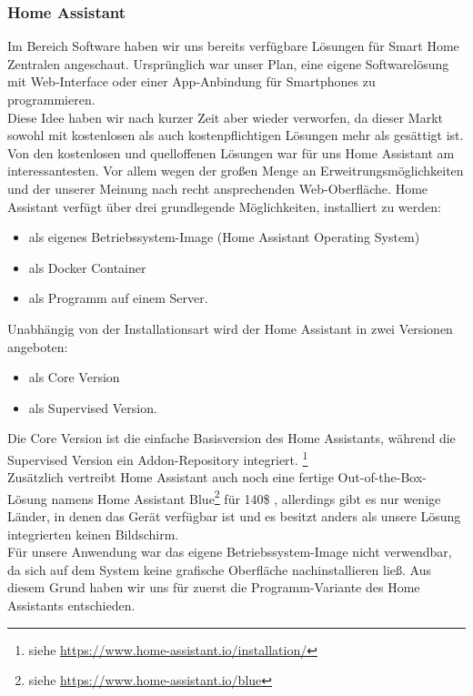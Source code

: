 \subsubsection{Home Assistant}\label{hwg_software_homeassistant}
Im Bereich Software haben wir uns bereits verfügbare Lösungen für Smart Home Zentralen angeschaut. 
Ursprünglich war unser Plan, eine eigene Softwarelösung mit Web-Interface oder einer App-Anbindung für Smartphones zu programmieren.\\
\noindent Diese Idee haben wir nach kurzer Zeit aber wieder verworfen, da dieser Markt sowohl mit kostenlosen als auch kostenpflichtigen Lösungen mehr als gesättigt ist. 
Von den kostenlosen und quelloffenen Lösungen war für uns Home Assistant am interessantesten.
Vor allem wegen der großen Menge an Erweitrungsmöglichkeiten und der unserer Meinung nach recht ansprechenden Web-Oberfläche.
Home Assistant verfügt über drei grundlegende Möglichkeiten, installiert zu werden:
\begin{itemize}
    \item als eigenes Betriebssystem-Image (Home Assistant Operating System)
    \item als Docker Container
    \item als Programm auf einem Server.
\end{itemize}
Unabhängig von der Installationsart wird der Home Assistant in zwei Versionen angeboten:
\begin{itemize}
    \item als Core Version
    \item als Supervised Version.
\end{itemize}
Die Core Version ist die einfache Basisversion des Home Assistants, während die Supervised Version ein Addon-Repository integriert. \footnote{siehe \url{https://www.home-assistant.io/installation/}}\\
\noindent Zusätzlich vertreibt Home Assistant auch noch eine fertige Out-of-the-Box-Lösung namens Home Assistant Blue\footnote{siehe \url{https://www.home-assistant.io/blue}} für 140\$ , allerdings gibt es nur wenige Länder, in denen das Gerät verfügbar ist und es besitzt anders als unsere Lösung integrierten keinen Bildschirm.\\
\noindent Für unsere Anwendung war das eigene Betriebssystem-Image nicht verwendbar, da sich auf dem System keine grafische Oberfläche nachinstallieren ließ. 
Aus diesem Grund haben wir uns für zuerst die Programm-Variante des Home Assistants entschieden.\\
